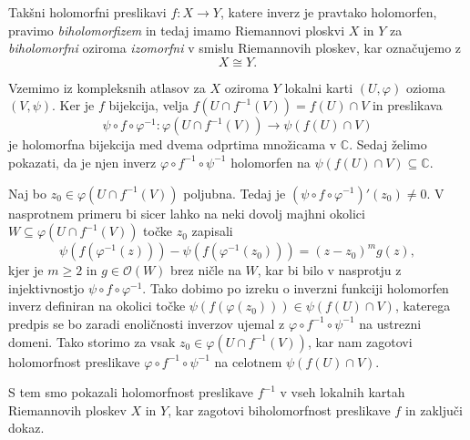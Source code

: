 \documentclass[mat1]{fmfdelo}
\newcommand{\C}{\mathbb C}
\newcommand{\inv}{^{-1}}
\newcommand{\hol}[1]{\mathcal{O}(#1)}
\theoremstyle{definition}
\begin{document}
\begin{opomba}
    Takšni holomorfni preslikavi $f : X \to Y$, katere inverz je pravtako holomorfen, pravimo \emph{biholomorfizem} in tedaj imamo Riemannovi ploskvi $X$ in $Y$ za \emph{biholomorfni} oziroma \emph{izomorfni} v smislu Riemannovih ploskev, kar označujemo z 
    \[
        X \cong Y.
    \]
\end{opomba}

\begin{dokaz}
    Vzemimo iz kompleksnih atlasov za $X$ oziroma $Y$ lokalni karti $(U, \varphi)$ ozioma $(V, \psi)$.
    Ker je $f$ bijekcija, velja $f(U \cap f\inv(V)) = f(U) \cap V$ in preslikava 
    \[
        \psi \circ f \circ \varphi\inv : \varphi(U \cap f\inv(V)) \to \psi(f(U) \cap V)  
    \]
    je holomorfna bijekcija med dvema odprtima množicama v $\C$. Sedaj želimo pokazati, da je njen inverz $\varphi \circ f\inv \circ \psi\inv$ holomorfen na $\psi(f(U) \cap V) \subseteq \C$.

    Naj bo $z_0 \in \varphi(U \cap f\inv(V))$ poljubna. Tedaj je $(\psi \circ f \circ \varphi\inv)'(z_0) \neq 0$. V nasprotnem primeru bi sicer lahko na neki dovolj majhni okolici $W \subseteq \varphi(U \cap f\inv(V))$ točke $z_0$ zapisali 
    \[
        \psi(f(\varphi\inv(z))) - \psi(f(\varphi\inv(z_0))) = (z - z_0)^m g(z),
    \]
    kjer je $m \geq 2$ in $g \in \hol{W}$ brez ničle na $W$, kar bi bilo v nasprotju z injektivnostjo $\psi \circ f \circ \varphi\inv$. Tako dobimo po izreku o inverzni funkciji \cite[Izrek 67]{Globevnik} holomorfen inverz definiran na okolici točke $\psi(f(\varphi(z_0))) \in \psi(f(U) \cap V)$, katerega predpis se bo zaradi enoličnosti inverzov ujemal z $\varphi \circ f\inv \circ \psi\inv$ na ustrezni domeni. Tako storimo za vsak $z_0 \in \varphi(U \cap f\inv(V))$, kar nam zagotovi holomorfnost preslikave $\varphi \circ f\inv \circ \psi\inv$ na celotnem $\psi(f(U) \cap V)$. 
    
    S tem smo pokazali holomorfnost preslikave $f\inv$ v vseh lokalnih kartah Riemannovih ploskev $X$ in $Y$, kar zagotovi biholomorfnost preslikave $f$ in zaključi dokaz. 
\end{dokaz}
\end{document}
